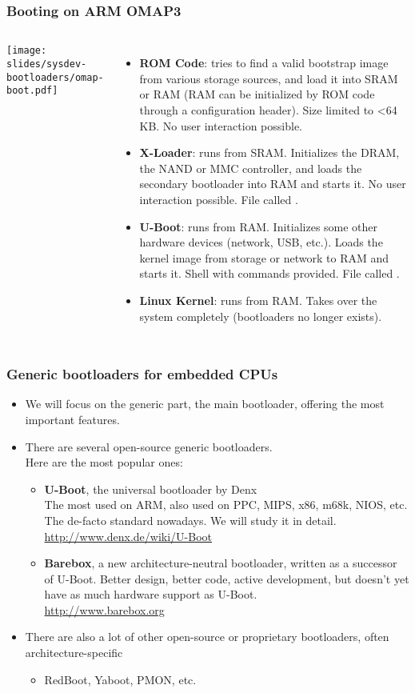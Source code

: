 \begin{frame}
\frametitle{Booting on ARM OMAP3}
  \begin{columns}
    \texttt{[image: slides/sysdev-bootloaders/omap-boot.pdf]}
    \footnotesize
    \begin{itemize}
    \item {\bf ROM Code}: tries to find a valid bootstrap image from
      various storage sources, and load it into SRAM or RAM (RAM can
      be initialized by ROM code through a configuration header). Size
      limited to \textless 64 KB. No user interaction possible.
    \item {\bf X-Loader}: runs from SRAM. Initializes the DRAM, the
      NAND or MMC controller, and loads the secondary bootloader into
      RAM and starts it. No user interaction possible. File called
      .
    \item {\bf U-Boot}: runs from RAM. Initializes some other hardware
      devices (network, USB, etc.).  Loads the kernel image from
      storage or network to RAM and starts it. Shell with commands
      provided. File called .
    \item {\bf Linux Kernel}: runs from RAM. Takes over the system
      completely (bootloaders no longer exists).
    \end{itemize}
  \end{columns}
\end{frame}

\begin{frame}
  \frametitle{Generic bootloaders for embedded CPUs}
  \begin{itemize}
  \item We will focus on the generic part, the main bootloader, offering
    the most important features.
  \item There are several open-source generic bootloaders.\\
    Here are the most popular ones:
    \begin{itemize}
    \item {\bf U-Boot}, the universal bootloader by Denx\\
      The most used on ARM, also used on PPC, MIPS, x86, m68k, NIOS,
      etc. The de-facto standard nowadays. We will study it in detail.\\
      \url{http://www.denx.de/wiki/U-Boot}
    \item {\bf Barebox}, a new architecture-neutral bootloader, written
      as a successor of U-Boot. Better design, better code, active
      development, but doesn't yet have as much hardware support as U-Boot.\\
      \url{http://www.barebox.org}
    \end{itemize}
  \item There are also a lot of other open-source or proprietary
    bootloaders, often architecture-specific
    \begin{itemize}
    \item RedBoot, Yaboot, PMON, etc.
    \end{itemize}
  \end{itemize}
\end{frame}
